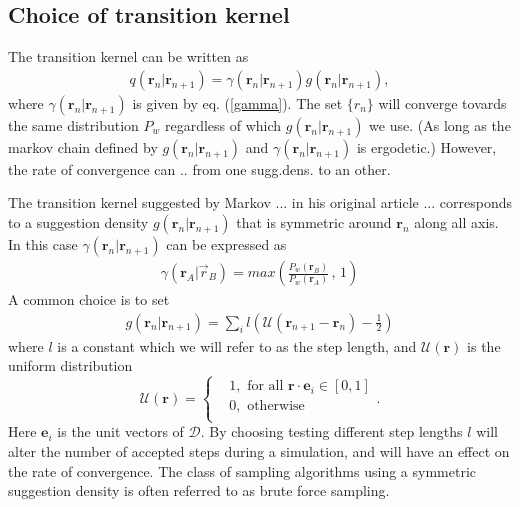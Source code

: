 \documentclass[a4paper,10pt,twocolumn]{article} %
\newcommand{\ts}[1]{\textbf{#1}}
\begin{document}

\subsection{Choice of transition kernel} %

The transition kernel can be written as
\begin{align}
	q(\ts r_n|\ts r_{n+1}) = \gamma(\ts r_n|\ts r_{n+1}) g(\ts r_n|\ts r_{n+1}), 
\end{align}
where $\gamma(\ts r_{n}|\ts r_{n+1})$ is given by eq. (\ref{gamma}). 
The set $\{r_n\}$ will converge tovards the same distribution $P_w$ regardless of which $g(\ts r_n|\ts r_{n+1})$ we use. 
(As long as the markov chain defined by $g(\ts r_n|\ts r_{n+1})$ and $\gamma(\ts r_n|\ts r_{n+1})$ is ergodetic.)
However, the rate of convergence can .. from one sugg.dens. to an other.

The transition kernel suggested by Markov ... in his original article ... corresponds to a suggestion density $g(\ts r_n|\ts r_{n+1})$ 
that is symmetric around $\ts r_n$ along all axis. In this case $\gamma(\ts r_n|\ts r_{n+1})$ can be expressed as
\begin{align} 
	\gamma(\ts r_A|\vec r_B)=max\left(
	\frac
	{P_w(\ts r_B)}
    {P_w(\ts r_A)}\, 
	,\, 1 \right) \label{gamma_bruteforce}
\end{align}
A common choice is to set
\begin{align}
	g(\ts r_n|\ts r_{n+1}) = \sum_i l\left(\mathcal U(\ts r_{n+1}-\ts r_n) - \frac12\right)
\end{align}
where $l$ is a constant which we will refer to as the step length, and $\mathcal U(\ts r)$ is the uniform distribution
\begin{equation}
	\mathcal U(\ts r) = \left\{ 
	\begin{split} 
		&1, \text{ for all } \ts r \cdot \ts e_i \in [0,1]\\
		&0, \text{ otherwise }\\
	\end{split}
	\right..
\end{equation} 
Here $\ts e_i$ is the unit vectors of $\mathcal D$. 
By choosing testing different step lengths $l$ will alter the number of 
accepted steps during a simulation, and will have an effect on the rate of convergence. %
The class of sampling algorithms using a symmetric suggestion density is often referred to as brute force sampling.
\end{document}
